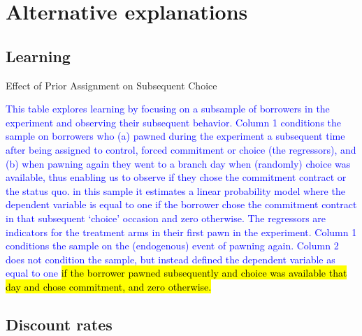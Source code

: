 \newpage
\section{Alternative explanations}

\vspace{.2in}
\subsection{Learning}

\vspace{.1in}
\begin{table}[H]
        \caption{Effect of Prior Assignment on Subsequent Choice}
    \label{learning_table}
\begin{center}
\scriptsize{}
\end{center}
 \scriptsize  \textcolor{blue}{This table explores learning by focusing on a subsample of borrowers in the experiment and observing their subsequent behavior. Column 1 conditions the sample on borrowers who (a) pawned during the experiment a subsequent time after being assigned to control, forced commitment or choice (the regressors), and (b) when pawning again they went to a branch day when (randomly) choice was available, thus enabling us to observe if they chose the commitment contract or the status quo.  in this sample it estimates a linear probability model where the dependent variable is equal to one if the borrower chose the commitment contract in that subsequent `choice' occasion and zero otherwise. The regressors are indicators for the treatment arms in their first pawn in the experiment. Column 1 conditions the sample on the (endogenous) event of pawning again. Column 2 does not condition the sample, but instead defined the dependent variable as equal to one \hl{if the borrower pawned subsequently and choice was available that day and chose commitment, and zero otherwise.}}
\end{table}




\vspace{.3in}

\subsection{Discount rates}



